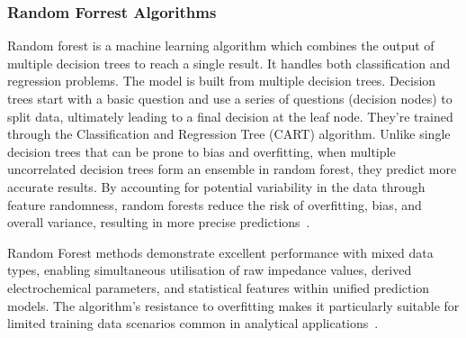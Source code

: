 \subsubsection{Random Forrest Algorithms}
Random forest is a machine learning algorithm which combines the output of multiple decision trees to reach a single result. It handles both classification and regression problems.
The model is built from multiple decision trees. Decision trees start with a basic question and use a series of questions (decision nodes) to split data, ultimately leading to a final decision at the leaf node. They're trained through the Classification and Regression Tree (CART) algorithm.
Unlike single decision trees that can be prone to bias and overfitting, when multiple uncorrelated decision trees form an ensemble in random forest, they predict more accurate results.
By accounting for potential variability in the data through feature randomness, random forests reduce the risk of overfitting, bias, and overall variance, resulting in more precise predictions~\cite{ibm_randomforrest}.

Random Forest methods demonstrate excellent performance with mixed data types, enabling simultaneous utilisation of raw impedance values, derived electrochemical parameters, and statistical features within unified prediction models.
The algorithm's resistance to overfitting makes it particularly suitable for limited training data scenarios common in analytical applications~\cite{salman_random_2024}.

